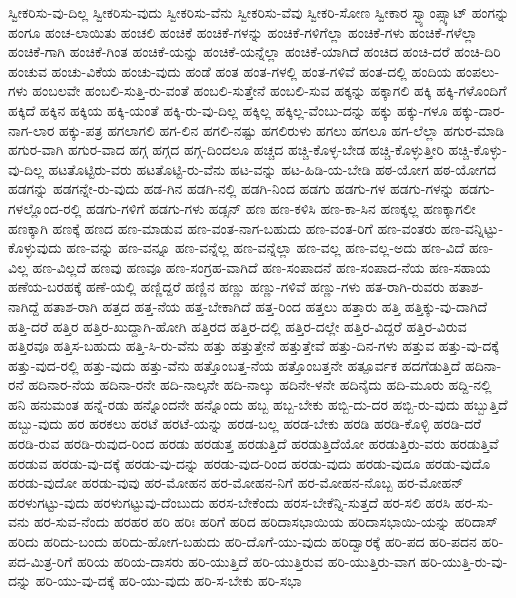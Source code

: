 {ಸ್ವೀಕರಿಸು-ವು-ದಿಲ್ಲ
ಸ್ವೀಕರಿಸು-ವುದು
ಸ್ವೀಕರಿಸು-ವೆನು
ಸ್ವೀಕರಿಸು-ವೆವು
ಸ್ವೀಕರಿ-ಸೋಣ
ಸ್ವೀಕಾರ
ಸ್ವ್ಯಾಂಪ್ಸ್ಕಾಟ್
ಹಂಗನ್ನು
ಹಂಗೂ
ಹಂಚ-ಲಾಯಿತು
ಹಂಚಲಿ
ಹಂಚಿಕೆ
ಹಂಚಿಕೆ-ಗಳನ್ನು
ಹಂಚಿಕೆ-ಗಳಿಗೆಲ್ಲಾ
ಹಂಚಿಕೆ-ಗಳು
ಹಂಚಿಕೆ-ಗಳೆಲ್ಲಾ
ಹಂಚಿಕೆ-ಗಾಗಿ
ಹಂಚಿಕೆ-ಗಿಂತ
ಹಂಚಿಕೆ-ಯನ್ನು
ಹಂಚಿಕೆ-ಯನ್ನೆಲ್ಲಾ
ಹಂಚಿಕೆ-ಯಾಗಿದೆ
ಹಂಚಿದ
ಹಂಚಿ-ದರೆ
ಹಂಚಿ-ದಿರಿ
ಹಂಚುವ
ಹಂಚು-ವಿಕೆಯ
ಹಂಚು-ವುದು
ಹಂಡೆ
ಹಂತ
ಹಂತ-ಗಳಲ್ಲಿ
ಹಂತ-ಗಳಿವೆ
ಹಂತ-ದಲ್ಲಿ
ಹಂದಿಯ
ಹಂಪಲು-ಗಳು
ಹಂಬಲವೇ
ಹಂಬಲಿ-ಸುತ್ತಿ-ರು-ವಂತೆ
ಹಂಬಲಿ-ಸುತ್ತೇನೆ
ಹಂಬಲಿ-ಸುವ
ಹಕ್ಕನ್ನು
ಹಕ್ಕಾಗಲಿ
ಹಕ್ಕಿ
ಹಕ್ಕಿ-ಗಳೊಂದಿಗೆ
ಹಕ್ಕಿದೆ
ಹಕ್ಕಿನ
ಹಕ್ಕಿಯ
ಹಕ್ಕಿ-ಯಂತೆ
ಹಕ್ಕಿ-ರು-ವು-ದಿಲ್ಲ
ಹಕ್ಕಿಲ್ಲ
ಹಕ್ಕಿಲ್ಲ-ವೆಂಬು-ದನ್ನು
ಹಕ್ಕು
ಹಕ್ಕು-ಗಳೂ
ಹಕ್ಕು-ದಾರ-ನಾಗ-ಲಾರ
ಹಕ್ಕು-ಪತ್ರ
ಹಗಲಾಗಲಿ
ಹಗ-ಲಿನ
ಹಗಲಿ-ನಷ್ಟು
ಹಗಲಿರುಳು
ಹಗಲು
ಹಗಲೂ
ಹಗ-ಲೆಲ್ಲಾ
ಹಗುರ-ಮಾಡಿ
ಹಗುರ-ವಾಗಿ
ಹಗುರ-ವಾದ
ಹಗ್ಗ
ಹಗ್ಗದ
ಹಗ್ಗ-ದಿಂದಲೂ
ಹಚ್ಚದ
ಹಚ್ಚಿ-ಕೊಳ್ಳ-ಬೇಡ
ಹಚ್ಚಿ-ಕೊಳ್ಳುತ್ತೀರಿ
ಹಚ್ಚಿ-ಕೊಳ್ಳು-ವು-ದಿಲ್ಲ
ಹಟತೊಟ್ಟಿರು-ವರು
ಹಟತೊಟ್ಟಿ-ರು-ವೆನು
ಹಟ-ವನ್ನು
ಹಟ-ಹಿಡಿ-ಯ-ಬೇಡಿ
ಹಠ-ಯೋಗ
ಹಠ-ಯೋಗದ
ಹಡಗನ್ನು
ಹಡಗನ್ನೇ-ರು-ವುದು
ಹಡ-ಗಿನ
ಹಡಗಿ-ನಲ್ಲಿ
ಹಡಗಿ-ನಿಂದ
ಹಡಗು
ಹಡಗು-ಗಳ
ಹಡಗು-ಗಳನ್ನು
ಹಡಗು-ಗಳಲ್ಲೊಂದ-ರಲ್ಲಿ
ಹಡಗು-ಗಳಿಗೆ
ಹಡಗು-ಗಳು
ಹಡ್ಸನ್
ಹಣ
ಹಣ-ಕಳಿಸಿ
ಹಣ-ಕಾ-ಸಿನ
ಹಣಕ್ಕಲ್ಲ
ಹಣಕ್ಕಾಗಲೀ
ಹಣಕ್ಕಾಗಿ
ಹಣಕ್ಕೆ
ಹಣದ
ಹಣ-ಮಾಡುವ
ಹಣ-ವಂತ-ನಾಗ-ಬಹುದು
ಹಣ-ವಂತ-ರಿಗೆ
ಹಣ-ವಂತರು
ಹಣ-ವನ್ನಿಟ್ಟು-ಕೊಳ್ಳುವುದು
ಹಣ-ವನ್ನು
ಹಣ-ವನ್ನೂ
ಹಣ-ವನ್ನೆಲ್ಲ
ಹಣ-ವನ್ನೆಲ್ಲಾ
ಹಣ-ವಲ್ಲ
ಹಣ-ವಲ್ಲ-ಅದು
ಹಣ-ವಿದೆ
ಹಣ-ವಿಲ್ಲ
ಹಣ-ವಿಲ್ಲದೆ
ಹಣವು
ಹಣವೂ
ಹಣ-ಸಂಗ್ರಹ-ವಾಗಿದೆ
ಹಣ-ಸಂಪಾದನೆ
ಹಣ-ಸಂಪಾದ-ನೆಯ
ಹಣ-ಸಹಾಯ
ಹಣೆಯ-ಬರಹಕ್ಕೆ
ಹಣೆ-ಯಲ್ಲಿ
ಹಣ್ಣಿದ್ದರೆ
ಹಣ್ಣಿನ
ಹಣ್ಣು
ಹಣ್ಣು-ಗಳಿವೆ
ಹಣ್ಣು-ಗಳು
ಹತ-ರಾಗಿ-ರುವರು
ಹತಾಶ-ನಾಗಿದ್ದೆ
ಹತಾಶ-ರಾಗಿ
ಹತ್ತದ
ಹತ್ತ-ನೆಯ
ಹತ್ತ-ಬೇಕಾಗಿದೆ
ಹತ್ತ-ರಿಂದ
ಹತ್ತಲು
ಹತ್ತಾರು
ಹತ್ತಿ
ಹತ್ತಿಕ್ಕು-ವು-ದಾಗಿದೆ
ಹತ್ತಿ-ದರೆ
ಹತ್ತಿರ
ಹತ್ತಿರ-ಖುದ್ದಾಗಿ-ಹೋಗಿ
ಹತ್ತಿರದ
ಹತ್ತಿರ-ದಲ್ಲಿ
ಹತ್ತಿರ-ದಲ್ಲೇ
ಹತ್ತಿರ-ವಿದ್ದರೆ
ಹತ್ತಿರ-ವಿರುವ
ಹತ್ತಿರವೂ
ಹತ್ತಿಸ-ಬಹುದು
ಹತ್ತಿ-ಸಿ-ರು-ವೆನು
ಹತ್ತು
ಹತ್ತುತ್ತೇನೆ
ಹತ್ತುತ್ತೇವೆ
ಹತ್ತು-ದಿನ-ಗಳು
ಹತ್ತುವ
ಹತ್ತು-ವು-ದಕ್ಕೆ
ಹತ್ತು-ವುದ-ರಲ್ಲಿ
ಹತ್ತು-ವುದು
ಹತ್ತು-ವೆನು
ಹತ್ತೊಂಬತ್ತ-ನೆಯ
ಹತ್ತೊಂಬತ್ತನೇ
ಹತ್ಪೂರ್ವಕ
ಹದಗೆಡುತ್ತಿದೆ
ಹದಿನಾ-ರನೆ
ಹದಿನಾರ-ನೆಯ
ಹದಿನಾ-ರನೇ
ಹದಿ-ನಾಲ್ಕನೇ
ಹದಿ-ನಾಲ್ಕು
ಹದಿನೇ-ಳನೇ
ಹದಿನೈದು
ಹದಿ-ಮೂರು
ಹದ್ದಿ-ನಲ್ಲಿ
ಹನಿ
ಹನುಮಂತ
ಹನ್ನೆ-ರಡು
ಹನ್ನೊಂದನೇ
ಹನ್ನೊಂದು
ಹಬ್ಬ
ಹಬ್ಬ-ಬೇಕು
ಹಬ್ಬಿ-ದು-ದರ
ಹಬ್ಬಿ-ರು-ವುದು
ಹಬ್ಬುತ್ತಿದೆ
ಹಬ್ಬು-ವುದು
ಹರ
ಹರಕಲು
ಹರಟೆ
ಹರಟೆ-ಯನ್ನು
ಹರಡ-ಬಲ್ಲ
ಹರಡ-ಬೇಕು
ಹರಡಿ
ಹರಡಿ-ಕೊಳ್ಳಿ
ಹರಡಿ-ದರೆ
ಹರಡಿ-ರುವ
ಹರಡಿ-ರುವುದ-ರಿಂದ
ಹರಡು
ಹರಡುತ್ತ
ಹರಡುತ್ತಿದೆ
ಹರಡುತ್ತಿದೆಯೋ
ಹರಡುತ್ತಿರು-ವರು
ಹರಡುತ್ತಿವೆ
ಹರಡುವ
ಹರಡು-ವು-ದಕ್ಕೆ
ಹರಡು-ವು-ದನ್ನು
ಹರಡು-ವುದ-ರಿಂದ
ಹರಡು-ವುದು
ಹರಡು-ವುದೂ
ಹರಡು-ವುದೊ
ಹರಡು-ವುದೋ
ಹರಡು-ವುವು
ಹರ-ಮೋಹನ
ಹರ-ಮೋಹನ-ನಿಗೆ
ಹರ-ಮೋಹನ-ನೊಬ್ಬ
ಹರ-ಮೋಹನ್
ಹರಳುಗಟ್ಟು-ವುದು
ಹರಳುಗಟ್ಟುವು-ದೆಂಬುದು
ಹರಸ-ಬೇಕೆಂದು
ಹರಸ-ಬೇಕೆನ್ನಿ-ಸುತ್ತದೆ
ಹರ-ಸಲಿ
ಹರಸಿ
ಹರ-ಸು-ವನು
ಹರ-ಸುವ-ನೆಂದು
ಹರಹರ
ಹರಿ
ಹರಿಃ
ಹರಿಗೆ
ಹರಿದ
ಹರಿದಾಸಭಾಯಿಯ
ಹರಿದಾಸಭಾಯಿ-ಯನ್ನು
ಹರಿದಾಸ್
ಹರಿದು
ಹರಿದು-ಬಂದು
ಹರಿದು-ಹೋಗ-ಬಹುದು
ಹರಿ-ದೊಗೆ-ಯು-ವುದು
ಹರಿದ್ವಾರಕ್ಕೆ
ಹರಿ-ಪದ
ಹರಿ-ಪದನ
ಹರಿ-ಪದ-ಮಿತ್ರ-ರಿಗೆ
ಹರಿಯ
ಹರಿಯ-ದಾಸರು
ಹರಿ-ಯುತ್ತಿದೆ
ಹರಿ-ಯುತ್ತಿರುವ
ಹರಿ-ಯುತ್ತಿರು-ವಾಗ
ಹರಿ-ಯುತ್ತಿ-ರು-ವು-ದನ್ನು
ಹರಿ-ಯು-ವು-ದಕ್ಕೆ
ಹರಿ-ಯು-ವುದು
ಹರಿ-ಸ-ಬೇಕು
ಹರಿ-ಸಭಾ
}
